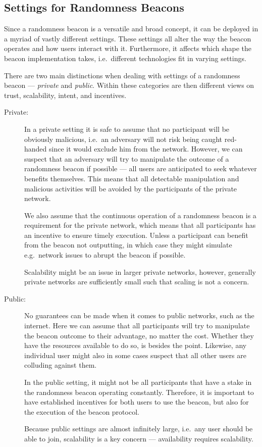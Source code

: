 \subsection{Settings for Randomness Beacons}
Since a randomness beacon is a versatile and broad concept, it can be deployed in a myriad of vastly different settings.
These settings all alter the way the beacon operates and how users interact with it.
Furthermore, it affects which shape the beacon implementation takes, i.e.\ different technologies fit in varying settings.

There are two main distinctions when dealing with settings of a randomness beacon --- \emph{private} and \emph{public}.
Within these categories are then different views on trust, scalability, intent, and incentives.

\begin{description}
    \item[Private:]
        In a private setting it is safe to assume that no participant will be obviously malicious, i.e.\ an adversary will not risk being caught red-handed since it would exclude him from the network.
        However, we can suspect that an adversary will try to manipulate the outcome of a randomness beacon if possible --- all users are anticipated to seek whatever benefits themselves.
        This means that all detectable manipulation and malicious activities will be avoided by the participants of the private network.

        We also assume that the continuous operation of a randomness beacon is a requirement for the private network, which means that all participants has an incentive to ensure timely execution.
        Unless a participant can benefit from the beacon not outputting, in which case they might simulate e.g.\ network issues to abrupt the beacon if possible.

        Scalability might be an issue in larger private networks, however, generally private networks are sufficiently small such that scaling is not a concern.
    \item[Public:]
        No guarantees can be made when it comes to public networks, such as the internet.
        Here we can assume that all participants will try to manipulate the beacon outcome to their advantage, no matter the cost.
        Whether they have the resources available to do so, is besides the point.
        Likewise, any individual user might also in some cases suspect that all other users are colluding against them.

        In the public setting, it might not be all participants that have a stake in the randomness beacon operating constantly.
        Therefore, it is important to have established incentives for both users to use the beacon, but also for the execution of the beacon protocol.

        Because public settings are almost infinitely large, i.e.\ any user should be able to join, scalability is a key concern --- availability requires scalability.
\end{description}

